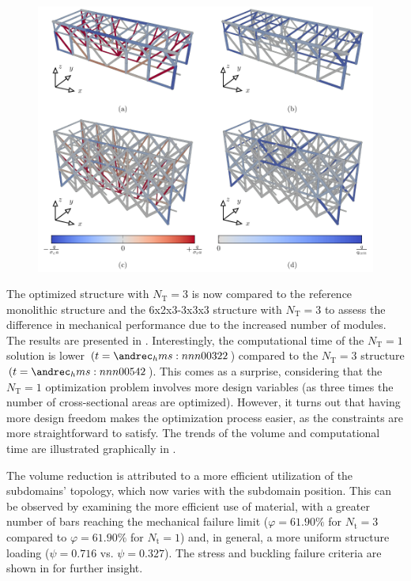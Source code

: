 \begin{figure}
    \centering
    \includegraphics[width=\linewidth]{figures/05_cellular_opt/00_multiple_failure/mul_mech.pdf}
    \caption{}
    \label{fig:05_multiple_topology_sol_mech}
\end{figure}

The optimized structure with $N_\text{T}=3$ is now compared to the reference monolithic structure and the 6x2x3-3x3x3 structure with $N_\text{T}=3$ to assess the difference in mechanical performance due to the increased number of modules. The results are presented in . Interestingly, the computational time of the $N_\text{T}=1$ solution is lower $(t = \hms{00;3;22}$) compared to the $N_\text{T}=3$ structure $(t = \hms{00;5;42}$). This comes as a surprise, considering that the $N_\text{T}=1$ optimization problem involves more design variables (as three times the number of cross-sectional areas are optimized). However, it turns out that having more design freedom makes the optimization process easier, as the constraints are more straightforward to satisfy. The trends of the volume and computational time are illustrated graphically in .

The volume reduction is attributed to a more efficient utilization of the subdomains' topology, which now varies with the subdomain position. This can be observed by examining the more efficient use of material, with a greater number of bars reaching the mechanical failure limit ($\varphi = 61.90\%$ for $N_\text{t} = 3$ compared to $\varphi = 61.90\%$ for $N_\text{t} = 1$) and, in general, a more uniform structure loading ($\psi = 0.716$ vs. $\psi = 0.327$). The stress and buckling failure criteria are shown in  for further insight.


